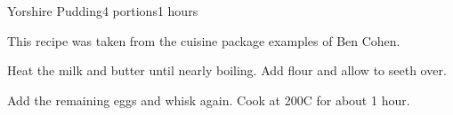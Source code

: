 \documentclass[openany]{book}
\begin{document}
\begin{recipe}{Yorshire Pudding}{4 portions}{1 hours}

\freeform This recipe was taken from the cuisine package examples of Ben Cohen.


Heat the milk and butter until nearly boiling. Add flour and allow to seeth over.


Add the remaining eggs and whisk again. Cook at 200\0C for about 1 hour.

\end{recipe}
\end{document}
